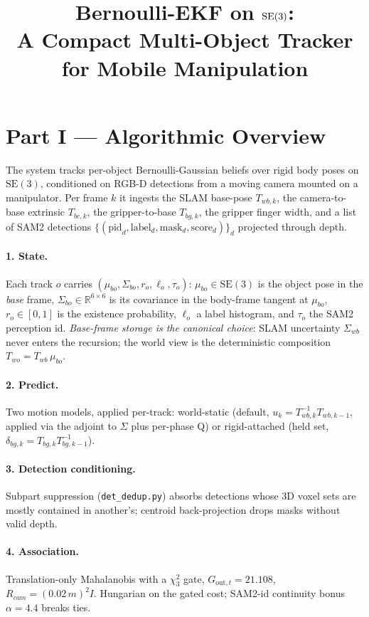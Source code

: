 \documentclass[11pt]{article}
\title{Bernoulli-EKF on $\SE$:\\
  A Compact Multi-Object Tracker for Mobile Manipulation}
\author{}
\date{}
\newcommand{\R}{\mathbb{R}}
\newcommand{\SE}{\mathrm{SE}(3)}
\newcommand{\file}[1]{\texttt{#1}}
\begin{document}
\maketitle

\section*{Part I — Algorithmic Overview}
\label{sec:overview}

The system tracks per-object Bernoulli-Gaussian beliefs over rigid
body poses on $\SE$, conditioned on RGB-D detections from a moving
camera mounted on a manipulator. Per frame $k$ it ingests the SLAM
base-pose $T_{wb,k}$, the camera-to-base extrinsic $T_{bc,k}$, the
gripper-to-base $T_{bg,k}$, the gripper finger width, and a list of
SAM2 detections $\{(\mathrm{pid}_d, \mathrm{label}_d, \mathrm{mask}_d,
\mathrm{score}_d)\}_d$ projected through depth.

\paragraph{1. State.} Each track $o$ carries
$(\mu_{bo}, \Sigma_{bo}, r_o, \ell_o, \tau_o)$:
$\mu_{bo} \in \SE$ is the object pose in the \emph{base} frame,
$\Sigma_{bo} \in \R^{6\times 6}$ is its covariance in the body-frame
tangent at $\mu_{bo}$, $r_o \in [0,1]$ is the existence probability,
$\ell_o$ a label histogram, and $\tau_o$ the SAM2 perception id.
\emph{Base-frame storage is the canonical choice}: SLAM uncertainty
$\Sigma_{wb}$ never enters the recursion; the world view is the
deterministic composition $T_{wo} = T_{wb}\,\mu_{bo}$.

\paragraph{2. Predict.} Two motion models, applied per-track:
world-static (default, $u_k = T_{wb,k}^{-1}T_{wb,k-1}$, applied via
the adjoint to $\Sigma$ plus per-phase Q) or rigid-attached
(held set, $\delta_{bg,k} = T_{bg,k}T_{bg,k-1}^{-1}$).

\paragraph{3. Detection conditioning.} Subpart suppression
(\file{det\_dedup.py}) absorbs detections whose 3D voxel sets are
mostly contained in another's; centroid back-projection drops masks
without valid depth.

\paragraph{4. Association.} Translation-only Mahalanobis with a
$\chi^2_3$ gate, $G_{\text{out},t}=21.108$, $R_{cam}=(0.02\,m)^2 I$.
Hungarian on the gated cost; SAM2-id continuity bonus $\alpha=4.4$
breaks ties.
\end{document}
